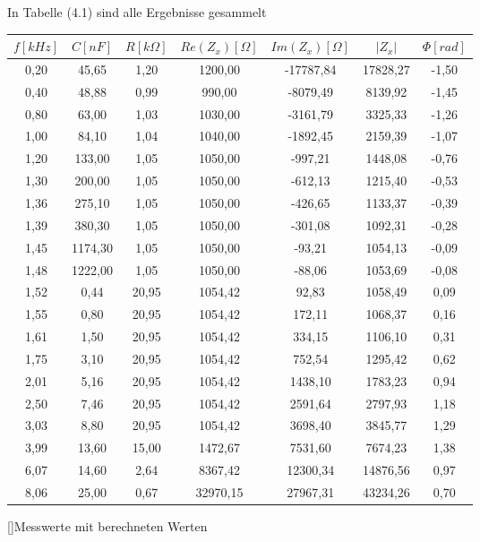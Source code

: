 In Tabelle (4.1) sind alle Ergebnisse gesammelt
    \begin{center}
    \begin{tabular}{c|c|c|c|c|c|c}
$f [kHz]$    & $C [nF]$       & $R [k\Omega]$     & $Re(Z_x) [\Omega]$ & $Im(Z_x) [\Omega]$  & $|Z_x|$   & $\Phi [rad]$ \\ \hline \hline
0,20 & 45,65   & 1,20  & 1200,00  & -17787,84 & 17828,27 & -1,50 \\
0,40 & 48,88   & 0,99  & 990,00   & -8079,49  & 8139,92  & -1,45 \\
0,80 & 63,00   & 1,03  & 1030,00  & -3161,79  & 3325,33  & -1,26 \\
1,00 & 84,10   & 1,04  & 1040,00  & -1892,45  & 2159,39  & -1,07 \\
1,20 & 133,00  & 1,05  & 1050,00  & -997,21   & 1448,08  & -0,76 \\
1,30 & 200,00  & 1,05  & 1050,00  & -612,13   & 1215,40  & -0,53 \\
1,36 & 275,10  & 1,05  & 1050,00  & -426,65   & 1133,37  & -0,39 \\
1,39 & 380,30  & 1,05  & 1050,00  & -301,08   & 1092,31  & -0,28 \\
1,45 & 1174,30 & 1,05  & 1050,00  & -93,21    & 1054,13  & -0,09 \\
1,48 & 1222,00 & 1,05  & 1050,00  & -88,06    & 1053,69  & -0,08 \\ \hline 
1,52 & 0,44    & 20,95 & 1054,42  & 92,83     & 1058,49  & 0,09  \\
1,55 & 0,80    & 20,95 & 1054,42  & 172,11    & 1068,37  & 0,16  \\
1,61 & 1,50    & 20,95 & 1054,42  & 334,15    & 1106,10  & 0,31  \\
1,75 & 3,10    & 20,95 & 1054,42  & 752,54    & 1295,42  & 0,62  \\
2,01 & 5,16    & 20,95 & 1054,42  & 1438,10   & 1783,23  & 0,94  \\
2,50 & 7,46    & 20,95 & 1054,42  & 2591,64   & 2797,93  & 1,18  \\
3,03 & 8,80    & 20,95 & 1054,42  & 3698,40   & 3845,77  & 1,29  \\
3,99 & 13,60   & 15,00 & 1472,67  & 7531,60   & 7674,23  & 1,38  \\
6,07 & 14,60   & 2,64  & 8367,42  & 12300,34  & 14876,56 & 0,97  \\
8,06 & 25,00   & 0,67  & 32970,15 & 27967,31  & 43234,26 & 0,70 
\end{tabular}
    []{Messwerte mit berechneten Werten}
    \end{center}
